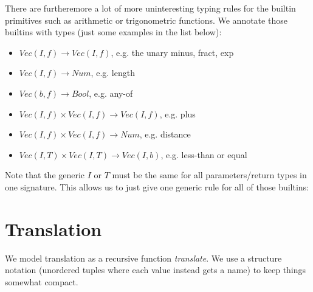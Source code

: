 \documentclass[letterpaper,12pt]{article}
\begin{document}
\medskip
There are furtheremore a lot of more uninteresting typing rules for
the builtin primitives such as arithmetic or trigonometric functions.
We annotate those builtins with types (just some examples in the list below):

\begin{itemize}
	\item $Vec(I,f) \rightarrow Vec(I,f)$, e.g. the unary minus, fract, exp
	\item $Vec(I,f) \rightarrow Num$, e.g. length
	\item $Vec(b,f) \rightarrow Bool$, e.g. any-of
	\item $Vec(I,f) \times Vec(I,f) \rightarrow Vec(I,f)$, e.g. plus
	\item $Vec(I,f) \times Vec(I,f) \rightarrow Num$, e.g. distance
	\item $Vec(I,T) \times Vec(I,T) \rightarrow Vec(I,b)$, e.g. less-than or equal
\end{itemize}

Note that the generic $I$ or $T$ must be the same for all parameters/return
types in one signature. This allows us to just give one generic rule 
for all of those builtins:

\begin{prooftree}
\end{prooftree}


\section{Translation}

We model translation as a recursive function \textit{translate}.
We use a structure notation (unordered tuples where each value
instead gets a name) to keep things somewhat compact.
\end{document}
